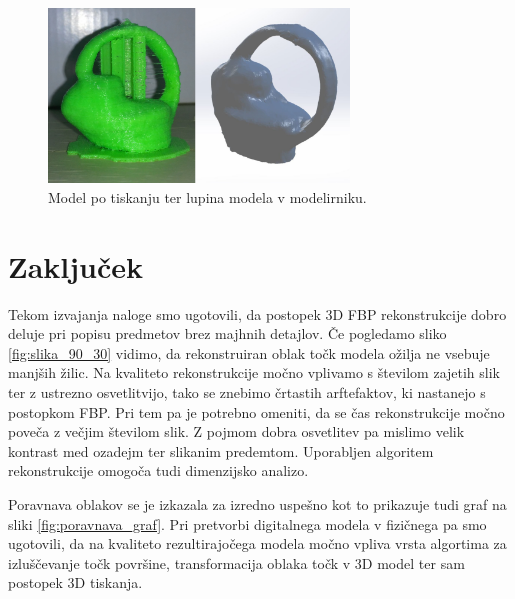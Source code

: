 \documentclass[journal,a4paper,twoside]{sty/IEEEtran}
\begin{document}
\begin{figure}[H]
	\centerline{\includegraphics[width=8cm]{fig/print_slusalke}}
	\caption{Model po tiskanju ter lupina modela v modelirniku.}
	\label{fig:print_slusalke}
\end{figure}


\section{Zaključek}
Tekom izvajanja naloge smo ugotovili, da postopek 3D FBP rekonstrukcije dobro deluje pri popisu predmetov brez majhnih detajlov. Če pogledamo sliko \ref{fig:slika_90_30} vidimo, da rekonstruiran oblak točk modela ožilja ne vsebuje manjših žilic. Na kvaliteto rekonstrukcije močno vplivamo s številom zajetih slik ter z ustrezno osvetlitvijo, tako se znebimo črtastih arftefaktov, ki nastanejo s postopkom FBP. Pri tem pa je potrebno omeniti, da se čas rekonstrukcije močno poveča z večjim številom slik. Z pojmom dobra osvetlitev pa mislimo velik kontrast med ozadejm ter slikanim predemtom. Uporabljen algoritem rekonstrukcije omogoča tudi dimenzijsko analizo.

Poravnava oblakov se je izkazala za izredno uspešno kot to prikazuje tudi graf na sliki \ref{fig:poravnava_graf}. Pri pretvorbi digitalnega modela v fizičnega pa smo ugotovili, da na kvaliteto rezultirajočega modela močno vpliva vrsta algortima za izluščevanje točk površine, transformacija oblaka točk v 3D model ter sam postopek 3D tiskanja.

\end{document}
